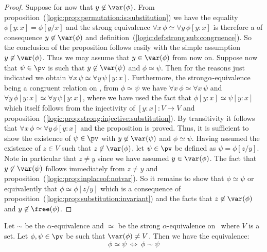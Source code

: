 \noindent
\begin{proof}
Suppose for now that $y\not\in\var(\phi)$. From
proposition~(\ref{logic:prop:permutation:is:substitution}) we have
the equality $\phi[y\!:\!x]=\phi[y/x]$ and the strong equivalence
$\forall x\,\phi\simeq\forall y\,\phi[y\!:\!x]$ is therefore a of
consequence $y\not\in\var(\phi)$ and
definition~(\ref{logic:def:strong:sub:congruence}). So the
conclusion of the proposition follows easily with the simple
assumption $y\not\in\var(\phi)$. Thus we may assume that
$y\in\var(\phi)$ from now on. Suppose now that $\psi\in\pv$ is such
that $y\not\in\var(\psi)$ and $\phi\simeq\psi$. Then for the reasons
just indicated we obtain $\forall x\,\psi\simeq\forall
y\,\psi[y\!:\!x]$. Furthermore, the strong$\alpha$-equivalence  
being a congruent relation on \pv, from $\phi\simeq\psi$ we have
$\forall x\,\phi\simeq\forall x\,\psi$ and $\forall
y\,\phi[y\!:\!x]\simeq\forall y\,\psi[y\!:\!x]$, where we have used
the fact that $\phi[y\!:\!x]\simeq\psi[y\!:\!x]$ which itself
follows from the injectivity of $[y\!:\!x]:V\to V$ and
proposition~(\ref{logic:prop:strong:injective:substitution}). By
transitivity it follows that $\forall x\,\phi\simeq\forall
y\,\phi[y\!:\!x]$ and the proposition is proved. Thus, it is
sufficient to show the existence of $\psi\in\pv$ with
$y\not\in\var(\psi)$ and $\phi\simeq\psi$. Having assumed the
existence of $z\in V$ such that $z\not\in\var(\phi)$, let
$\psi\in\pv$ be defined as $\psi=\phi[z/y]$. Note in particular that
$z\neq y$ since we have assumed $y\in\var(\phi)$. The fact that
$y\not\in\var(\psi)$ follows immediately from $z\neq y$ and
proposition~(\ref{logic:prop:inplaceof:notvar}). So it remains to
show that $\phi\simeq\psi$ or equivalently that
$\phi\simeq\phi[z/y]$ which is a consequence of
proposition~(\ref{logic:prop:substitution:invariant}) and the facts
that $z\not\in\var(\phi)$ and $y\not\in\free(\phi)$.
\end{proof}

\begin{prop}\label{logic:prop:FOPL:subcongvstrong:reverse}
Let $\sim$ be the $\alpha$-equivalence and $\simeq$ be the strong 
$\alpha$-equivalence on \pv\ where $V$ is a set. Let
$\phi,\psi\in\pv$ be such that $\var(\phi)\neq V$. Then we have the
equivalence:
    \[
    \phi\simeq\psi\ \Leftrightarrow\
    \phi\sim\psi
    \]
\end{prop}

